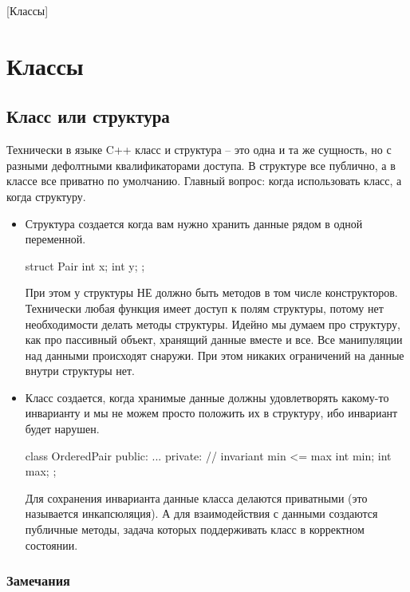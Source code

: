 [Классы]


\section{Классы}
\label{section::Classes}

\subsection{Класс или структура}

Технически в языке C++ класс и структура -- это одна и та же сущность, но с разными дефолтными квалификаторами доступа.
В структуре все публично, а в классе все приватно по умолчанию.
Главный вопрос: когда использовать класс, а когда структуру.

\begin{itemize}
\item Структура создается когда вам нужно хранить данные рядом в одной переменной.
\begin{cppcode}
struct Pair {
  int x;
  int y;
};
\end{cppcode}
При этом у структуры НЕ должно быть методов в том числе конструкторов.
Технически любая функция имеет доступ к полям структуры, потому нет необходимости делать методы структуры.
Идейно мы думаем про структуру, как про пассивный объект, хранящий данные вместе и все.
Все манипуляции над данными происходят снаружи.
При этом никаких ограничений на данные внутри структуры нет.

\item Класс создается, когда хранимые данные должны удовлетворять какому-то инварианту и мы не можем просто положить их в структуру, ибо инвариант будет нарушен.
\begin{cppcode}
class OrderedPair {
public:
  ...
private:
  // invariant min <= max
  int min;
  int max;
};
\end{cppcode}
Для сохранения инварианта данные класса делаются приватными (это называется инкапсюляция).
А для взаимодействия с данными создаются публичные методы, задача которых поддерживать класс в корректном состоянии.
\end{itemize}

\subsubsection{Замечания}
\label{section::Class::RawData}


